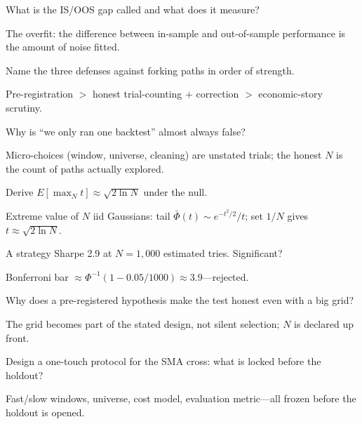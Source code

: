 \begin{exercise}[easy]
What is the IS/OOS gap called and what does it measure?
\end{exercise}
\begin{solution}
The overfit: the difference between in-sample and out-of-sample performance is the amount
of noise fitted.
\end{solution}

\begin{exercise}[easy]
Name the three defenses against forking paths in order of strength.
\end{exercise}
\begin{solution}
Pre-registration $>$ honest trial-counting $+$ correction $>$ economic-story scrutiny.
\end{solution}

\begin{exercise}[easy]
Why is ``we only ran one backtest'' almost always false?
\end{exercise}
\begin{solution}
Micro-choices (window, universe, cleaning) are unstated trials; the honest $N$ is the
count of paths actually explored.
\end{solution}

\begin{exercise}
Derive $E[\max_N t]\approx\sqrt{2\ln N}$ under the null.
\end{exercise}
\begin{solution}
Extreme value of $N$ iid Gaussians: tail $\bar\Phi(t)\sim e^{-t^2/2}/t$; set $1/N$ gives
$t\approx\sqrt{2\ln N}$.
\end{solution}

\begin{exercise}
A strategy Sharpe 2.9 at $N{=}1{,}000$ estimated tries. Significant?
\end{exercise}
\begin{solution}
Bonferroni bar $\approx\Phi^{-1}(1-0.05/1000)\approx3.9$---rejected.
\end{solution}

\begin{exercise}
Why does a pre-registered hypothesis make the test honest even with a big grid?
\end{exercise}
\begin{solution}
The grid becomes part of the stated design, not silent selection; $N$ is declared up
front.
\end{solution}

\begin{exercise}
Design a one-touch protocol for the SMA cross: what is locked before the holdout?
\end{exercise}
\begin{solution}
Fast/slow windows, universe, cost model, evaluation metric---all frozen before the
holdout is opened.
\end{solution}

